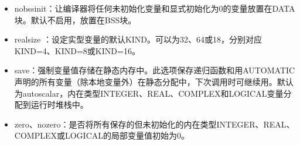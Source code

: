 \documentclass[a4paper,12pt,english]{sphinxmanual}
\begin{document}
\begin{itemize}
\begin{itemize}
\item {} 
\sphinxAtStartPar
\sphinxhyphen{}no\sphinxhyphen{}bss\sphinxhyphen{}init：让编译器将任何未初始化变量和显式初始化为0的变量放置在DATA块。默认不启用，放置在BSS块。

\item {} 
\sphinxAtStartPar
\sphinxhyphen{}real\sphinxhyphen{}size ：设定实型变量的默认KIND。可以为32、64或18，分别对应KIND=4、KIND=8或KIND=16。

\item {} 
\sphinxAtStartPar
\sphinxhyphen{}save：强制变量值存储在静态内存中。此选项保存递归函数和用AUTOMATIC声明的所有变量（除本地变量外）在静态分配中，下次调用时可继续用。默认为\sphinxhyphen{}auto\sphinxhyphen{}scalar，内在类型INTEGER、REAL、COMPLEX和LOGICAL变量分配到运行时堆栈中。

\item {} 
\sphinxAtStartPar
\sphinxhyphen{}zero、\sphinxhyphen{}nozero：是否将所有保存的但未初始化的内在类型INTEGER、REAL、COMPLEX或LOGICAL的局部变量值初始为0。

\end{itemize}

\end{itemize}
\end{document}
